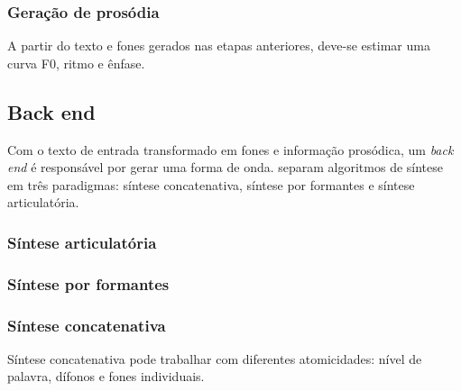\subsubsection{Geração de prosódia}
A partir do texto e fones gerados nas etapas anteriores, deve-se estimar uma
curva F0, ritmo e ênfase.


\subsection{Back end}
Com o texto de entrada transformado em fones e informação prosódica, um
\emph{back end} é responsável por gerar uma forma de onda.
 separam algoritmos de síntese em três paradigmas:
síntese concatenativa, síntese por formantes e síntese articulatória. 
\subsubsection{Síntese articulatória}
\subsubsection{Síntese por formantes}
\subsubsection{Síntese concatenativa}
Síntese concatenativa pode trabalhar com diferentes atomicidades: nível de palavra,
dífonos e fones individuais.

